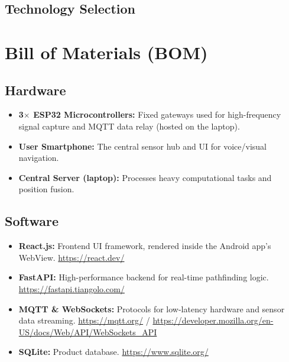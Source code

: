 \documentclass[12pt,a4paper]{article}
\begin{document}
\subsection{Technology Selection}


\section{Bill of Materials (BOM)}

\subsection{Hardware}

\begin{itemize}
    \item \textbf{3$\times$ ESP32 Microcontrollers:} Fixed gateways used for
    high-frequency signal capture and MQTT data relay (hosted on the laptop).

    \item \textbf{User Smartphone:} The central sensor hub and UI for
    voice/visual navigation.

    \item \textbf{Central Server (laptop):} Processes heavy computational tasks
    and position fusion.
\end{itemize}

\subsection{Software}

\begin{itemize}
    \item \textbf{React.js:} Frontend UI framework, rendered inside the
    Android app's WebView. \url{https://react.dev/}

    \item \textbf{FastAPI:} High-performance backend for real-time pathfinding
    logic. \url{https://fastapi.tiangolo.com/}

    \item \textbf{MQTT \& WebSockets:} Protocols for low-latency hardware and
    sensor data streaming. \url{https://mqtt.org/} /
    \url{https://developer.mozilla.org/en-US/docs/Web/API/WebSockets_API}

    \item \textbf{SQLite:} Product database. \url{https://www.sqlite.org/}
\end{itemize}
\end{document}
